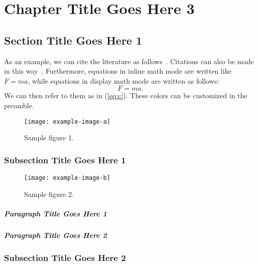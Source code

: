 \chapter{Chapter Title Goes Here 3}

\section{Section Title Goes Here 1}
As an example, we can cite the literature as follows~\cite{article-minimal,inbook-minimal}. Citations can also be made in this way~\cite{book-minimal,booklet-minimal,incollection-minimal}. Furthermore, equations in inline math mode are written like $F = ma$, while equations in display math mode are written as follows:
\begin{equation}
  \label{eq:c}
  F = ma.
\end{equation}
We can then refer to them as in (\ref{eq:c}). These colors can be customized in the preamble.

\lipsum[1-5]

\begin{figure}
  \centering
  \texttt{[image: example-image-a]}
  \caption{Sample figure 1.}
\end{figure}

\subsection{Subsection Title Goes Here 1}

\lipsum[6-9]

\begin{figure}
  \centering
  \texttt{[image: example-image-b]}
  \caption{Sample figure 2.}
\end{figure}

\paragraph{Paragraph Title Goes Here 1}

\lipsum[10]

\paragraph{Paragraph Title Goes Here 2}

\lipsum[11]

\subsection{Subsection Title Goes Here 2}

